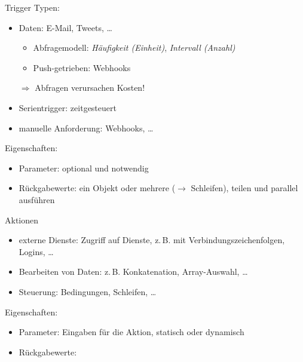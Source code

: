 \begin{flashcard}[Definition]{Trigger}
    Typen:
    \begin{itemize}
        \item Daten: E-Mail, Tweets, \ldots
            \begin{itemize}
                \item Abfragemodell: \emph{Häufigkeit (Einheit)}, \emph{Intervall (Anzahl)}
                \item Push-getrieben: Webhooks
            \end{itemize}
            $\Rightarrow$ Abfragen verursachen Kosten!
        \item Serientrigger: zeitgesteuert
        \item manuelle Anforderung: Webhooks, \ldots
    \end{itemize}
    Eigenschaften:
    \begin{itemize}
        \item Parameter: optional und notwendig
        \item Rückgabewerte: ein Objekt oder mehrere ($\rightarrow$ Schleifen), teilen und parallel ausführen
    \end{itemize}

\end{flashcard}

\begin{flashcard}[Definition]{Aktionen}
    \begin{itemize}
        \item externe Dienste: Zugriff auf Dienste, z.\,B. mit Verbindungszeichenfolgen, Logins, \ldots
        \item Bearbeiten von Daten: z.\,B. Konkatenation, Array-Auswahl, \ldots
        \item Steuerung: Bedingungen, Schleifen, \ldots
    \end{itemize}
    \vspace{1cm}
    Eigenschaften:
    \begin{itemize}
        \item Parameter: Eingaben für die Aktion, statisch oder dynamisch
        \item Rückgabewerte:
    \end{itemize}
\end{flashcard}

